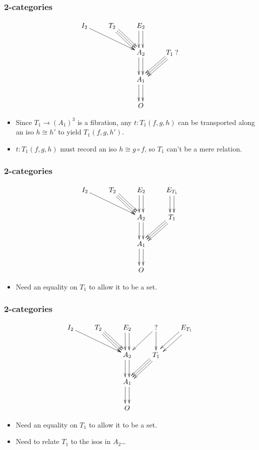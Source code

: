 \documentclass{beamer}
\begin{document}
\begin{frame}[t]
  \frametitle{2-categories}
  \[
  \vcenter{\xymatrix{
      I_2 \ar[drr] & T_2 \ar[dr] \ar@<1mm>[dr] \ar@<-1mm>[dr] & E_2 \ar@<1mm>[d] \ar@<-1mm>[d] \\
      && A_2 \ar@<1mm>[d] \ar@<-1mm>[d] & T_1 \; ? \ar[dl] \ar@<1mm>[dl] \ar@<-1mm>[dl]  \\
      && A_1 \ar@<1mm>[d] \ar@<-1mm>[d] \\
      && O}}
  \]
  \begin{itemize}
  \item Since $T_1 \to (A_1)^3$ is a fibration, any $t:T_1(f,g,h)$ can be transported along an iso $h \cong h'$ to yield $T_1(f,g,h')$.
  \item $t:T_1(f,g,h)$ must record an iso $h \cong g \circ f$, so $T_1$ can't be a mere relation.
  \end{itemize}
\end{frame}

\begin{frame}[t]
  \frametitle{2-categories}
  \[
  \vcenter{\xymatrix{
      I_2 \ar[drr] & T_2 \ar[dr] \ar@<1mm>[dr] \ar@<-1mm>[dr] & E_2 \ar@<1mm>[d] \ar@<-1mm>[d]
      & E_{T_1} \ar@<1mm>[d] \ar@<-1mm>[d]\\
      && A_2 \ar@<1mm>[d] \ar@<-1mm>[d] & T_1  \ar[dl] \ar@<1mm>[dl] \ar@<-1mm>[dl]  \\
      && A_1 \ar@<1mm>[d] \ar@<-1mm>[d] \\
      && O}}
  \]
  \begin{itemize}
  \item Need an equality on $T_1$ to allow it to be a set.
  \end{itemize}
\end{frame}

\begin{frame}[t]
  \frametitle{2-categories}
  \[
  \vcenter{\xymatrix{
      I_2 \ar[drr] & T_2 \ar[dr] \ar@<1mm>[dr] \ar@<-1mm>[dr] & E_2 \ar@<1mm>[d] \ar@<-1mm>[d]
      & ? \ar[dl] \ar[d]
      & E_{T_1} \ar@<1mm>[dl] \ar@<-1mm>[dl]\\
      && A_2 \ar@<1mm>[d] \ar@<-1mm>[d] & T_1  \ar[dl] \ar@<1mm>[dl] \ar@<-1mm>[dl]  \\
      && A_1 \ar@<1mm>[d] \ar@<-1mm>[d] \\
      && O}}
  \]
  \begin{itemize}
  \item Need an equality on $T_1$ to allow it to be a set.
  \item Need to relate $T_1$ to the isos in $A_2$\dots
  \end{itemize}
\end{frame}
\end{document}
